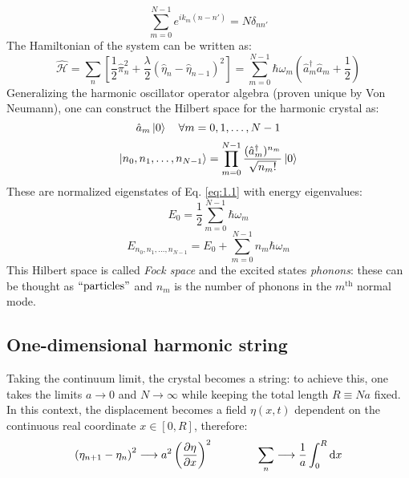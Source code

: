 \begin{equation}
  \sum_{m = 0}^{N - 1} e^{i k_m \left( n - n' \right)} = N \delta_{n n'}
  \label{eq:1.10}
\end{equation}
The Hamiltonian of the system can be written as:
\begin{equation}
  \hat{\mathcal{H}} = \sum_{n} \left[ \frac{1}{2} \hat{\pi}_n^2 + \frac{\lambda}{2} \left( \hat{\eta}_n - \hat{\eta}_{n-1} \right)^2 \right] = \sum_{m = 0}^{N - 1} \hbar \omega_m \left( \hat{a}_m^\dagger \hat{a}_m + \frac{1}{2} \right)
  \label{eq:1.11}
\end{equation}
Generalizing the harmonic oscillator operator algebra (proven unique by Von Neumann), one can construct the Hilbert space for the harmonic crystal as:
\begin{equation}
  \hat{a}_m \ket{0} \quad \forall m = 0, 1, \dots, N - 1
  \label{eq:1.12}
\end{equation}
\begin{equation}
  \ket{n_0, n_1, \dots, n_{N-1}} = \prod_{m = 0}^{N - 1} \frac{( \hat{a}_m^\dagger )^{n_m}}{\sqrt{n_m!}} \ket{0}
  \label{eq:1.13}
\end{equation}
These are normalized eigenstates of Eq. \ref{eq:1.1} with energy eigenvalues:
\begin{equation}
  E_0 = \frac{1}{2} \sum_{m = 0}^{N - 1} \hbar \omega_m
  \label{eq:1.14}
\end{equation}
\begin{equation}
  E_{n_0, n_1, \dots, n_{N-1}} = E_0 + \sum_{m = 0}^{N - 1} n_m \hbar \omega_m
  \label{eq:1.15}
\end{equation}
This Hilbert space is called \textit{Fock space} and the excited states \textit{phonons}: these can be thought as $ ``\text{particles}" $ and $ n_m $ is the number of phonons in the $ m^{\mathrm{th}} $ normal mode.

\subsection{One-dimensional harmonic string}

Taking the continuum limit, the crystal becomes a string: to achieve this, one takes the limits $ a \rightarrow 0 $ and $ N \rightarrow \infty $ while keeping the total length $ R \equiv N a $ fixed. In this context, the displacement becomes a field $ \eta(x,t) $ dependent on the continuous real coordinate $ x \in [0, R] $, therefore:
\begin{equation*}
  \left( \eta_{n + 1} - \eta_n \right)^2 \longrightarrow a^2 \left( \frac{\partial \eta}{\partial x} \right)^2
  \qquad \qquad
  \sum_{n} \longrightarrow \frac{1}{a} \int_0^R \mathrm{d} x
\end{equation*}

